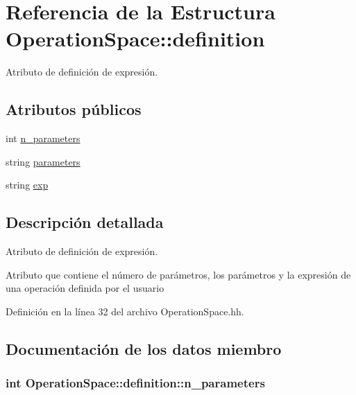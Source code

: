 \hypertarget{struct_operation_space_1_1definition}{}\section{Referencia de la Estructura Operation\+Space\+:\+:definition}
\label{struct_operation_space_1_1definition}


Atributo de definición de expresión.  


\subsection*{Atributos públicos}
\begin{DoxyCompactItemize}
\item 
int \hyperlink{struct_operation_space_1_1definition_ac27634dadda8ec0bf771c68e8db93fa2}{n\+\_\+parameters}
\item 
string \hyperlink{struct_operation_space_1_1definition_a3df061502e0e42166d31729418994f69}{parameters}
\item 
string \hyperlink{struct_operation_space_1_1definition_af50bcfd1fc8f83f8351ed5ba669c6fc7}{exp}
\end{DoxyCompactItemize}


\subsection{Descripción detallada}
Atributo de definición de expresión. 

Atributo que contiene el número de parámetros, los parámetros y la expresión de una operación definida por el usuario 

Definición en la línea 32 del archivo Operation\+Space.\+hh.



\subsection{Documentación de los datos miembro}
\subsubsection[{\texorpdfstring{n\+\_\+parameters}{n_parameters}}]{\setlength{\rightskip}{0pt plus 5cm}int Operation\+Space\+::definition\+::n\+\_\+parameters}\hypertarget{struct_operation_space_1_1definition_ac27634dadda8ec0bf771c68e8db93fa2}{}\label{struct_operation_space_1_1definition_ac27634dadda8ec0bf771c68e8db93fa2}


